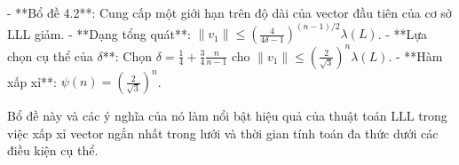 \documentclass{article}
\begin{document}
- **Bổ đề 4.2**: Cung cấp một giới hạn trên độ dài của vector đầu tiên của cơ sở LLL giảm.
- **Dạng tổng quát**: \( \|v_1\| \leq \left( \frac{4}{4\delta - 1} \right)^{(n-1)/2} \lambda(L) \).
- **Lựa chọn cụ thể của \( \delta \)**: Chọn \( \delta = \frac{1}{4} + \frac{3}{4}\frac{n}{n-1} \) cho \( \|v_1\| \leq \left( \frac{2}{\sqrt{3}} \right)^n \lambda(L) \).
- **Hàm xấp xỉ**: \( \psi(n) = \left( \frac{2}{\sqrt{3}} \right)^n \).

Bổ đề này và các ý nghĩa của nó làm nổi bật hiệu quả của thuật toán LLL trong việc xấp xỉ vector ngắn nhất trong lưới và thời gian tính toán đa thức dưới các điều kiện cụ thể.
 



\end{document}
